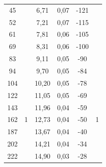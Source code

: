\documentclass[a4paper,12pt]{report}
\begin{document}
\begin{table}[H]
\begin{tabular}{|c|c|c|c|c|c|}
45                            &                                       & 6,71                              & 0,07                              & -121                         &                                      \\ \cline{1-1} \cline{3-5}
52                            &                                       & 7,21                              & 0,07                              & -115                         &                                      \\ \cline{1-1} \cline{3-5}
61                            &                                       & 7,81                              & 0,06                              & -105                         &                                      \\ \cline{1-1} \cline{3-5}
69                            &                                       & 8,31                              & 0,06                              & -100                         &                                      \\ \cline{1-1} \cline{3-5}
83                            &                                       & 9,11                              & 0,05                              & -90                          &                                      \\ \cline{1-1} \cline{3-5}
94                            &                                       & 9,70                              & 0,05                              & -84                          &                                      \\ \hline
104 & \multirow{13}{*}{1} & 10,20 & 0,05 & -78 & \multirow{13}{*}{1} \\ \cline{1-1} \cline{3-5}
122 &                     & 11,05 & 0,05 & -69 &                     \\ \cline{1-1} \cline{3-5}
143 &                     & 11,96 & 0,04 & -59 &                     \\ \cline{1-1} \cline{3-5}
162 &                     & 12,73 & 0,04 & -50 &                     \\ \cline{1-1} \cline{3-5}
187 &                     & 13,67 & 0,04 & -40 &                     \\ \cline{1-1} \cline{3-5}
202 &                     & 14,21 & 0,04 & -34 &                     \\ \cline{1-1} \cline{3-5}
222 &                     & 14,90 & 0,03 & -28 &                     \\ \cline{1-1} \cline{3-5}

\end{tabular}
\end{table}
\end{document}
